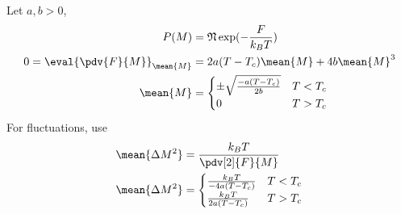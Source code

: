 \documentclass[12pt]{article}
\begin{document}
     \subsection{} Let \(a,b > 0\), \begin{align*}
        P(M) &= \mathfrak{N} \exp( - \frac{F}{k_BT}) \\
        0 =\eval{\pdv{F}{M}}_{\mean{M}} &= 2a(T - T_c)\mean{M} + 4b \mean{M}^3\\
        \mean{M} &= \begin{cases}
            \pm {\sqrt{\frac{ -a(T - T_c)}{2b} }} & T < T_c\\
            0& T > T_c
        \end{cases}
    \end{align*}
    For fluctuations, use \begin{align*}
        \mean{\Delta M^2} &=  \frac{k_BT}{\pdv[2]{F}{M}} \\
        \mean{\Delta M^2} &=  \begin{cases}
            \frac{k_BT}{ - 4a(T - T_c)} & T < T_c\\
            \frac{k_BT}{2a(T - T_c)} & T > T_c
        \end{cases}  
    \end{align*}
\end{document}
